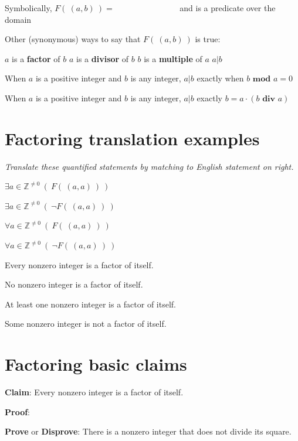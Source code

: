 \documentclass[12pt, oneside]{article}
\begin{document}
Symbolically, $F(~(a,b)~) = \phantom{\exists c\in \mathbb{Z}~(b=ac)}$
and is  a predicate over the domain \underline{}


Other (synonymous) ways to say that $F(~(a,b)~)$ is true: 
\begin{center}
$a$ is a {\bf factor} of $b$
\qquad 
$a$ is a {\bf divisor} of $b$
\qquad  $b$ is a {\bf multiple} of $a$
\qquad
$a | b$
\end{center}

When $a$ is a positive integer and $b$ is any integer, $a | b$
exactly when $b \textbf{ mod } a = 0$

When $a$ is a positive integer and $b$ is any integer, $a | b$
exactly $b = a \cdot (b \textbf{ div } a)$ \vfill
\section*{Factoring translation examples}


{\it Translate these quantified statements by matching to English statement on right.}

\begin{multicols}{2}
$\exists a\in \mathbb{Z}^{\neq 0} ~(~F(~(a,a)~)~)$

$\exists a\in \mathbb{Z}^{\neq 0} ~(~\lnot F(~(a,a)~)~)$

$\forall a\in \mathbb{Z}^{\neq 0} ~(~F(~(a,a)~)~)$

$\forall a\in \mathbb{Z}^{\neq 0} ~(~\lnot F(~(a,a)~)~)$


Every nonzero integer is a factor of itself.

No nonzero integer is a factor of itself.

At least one nonzero integer is a factor of itself.

Some nonzero integer is not a factor of itself.
\end{multicols} \vfill
\section*{Factoring basic claims}


{\bf Claim}: Every nonzero integer is a factor of itself.

{\bf Proof}: 


\vspace{150pt}


{\bf Prove} or {\bf Disprove}: There is a nonzero integer that does not divide its square.
\end{document}
